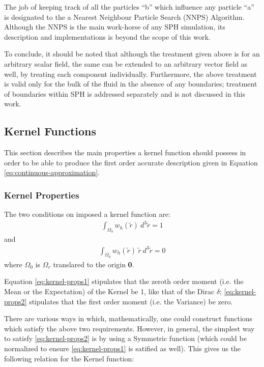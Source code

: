 The job of keeping track of all the particles ``b'' which influence any particle ``a'' is designated to the a Nearest Neighbour Particle Search (NNPS) Algorithm. Although the NNPS is the main work-horse of any SPH simulation, its description and implementations is beyond the scope of this work. 

To conclude, it should be noted that although the treatment given above is for an arbitrary scalar field, the same can be extended to an arbitrary vector field as well, by treating each component individually. Furthermore, the above treatment is valid only for the bulk of the fluid in the absence of any boundaries; treatment of boundaries within SPH is addressed separately and is not discussed in this work.

\subsection{Kernel Functions} \label{ssec:kernels}

This section describes the main properties a kernel function should possess in order to be able to produce the first order accurate description given in Equation \eqref{eq:continuous-approximation}.

\subsubsection{Kernel Properties}
 The two conditions on imposed a kernel function are:
 \begin{eqnarray} \label{eq:kernel-props1} 
  \int_{\varOmega_0} \textit{w$_h(\widetilde{r}) ~d^{3}\widetilde{r}$} = 1
 \end{eqnarray}
 and
 \begin{eqnarray}\label{eq:kernel-props2}
  \int_{\varOmega_0} \textit{w$_h(\widetilde{r})~ \widetilde{r}~ d^{3}\widetilde{r}$} = 0 
 \end{eqnarray} 
 where ${\varOmega_0}$ is ${\varOmega_r}$ translared to the origin \textbf{0}.
 

 Equation \eqref{eq:kernel-props1} stipulates that the zeroth order moment (i.e. the Mean or the Expectation) of the Kernel be 1, like that of the Dirac $\delta$; \eqref{eq:kernel-props2} stipulates that the first order moment (i.e. the Variance) be zero. 
 
 There are various ways in which, mathematically, one could construct functions which satisfy the above two requirements. However, in general, the simplest way to satisfy \eqref{eq:kernel-props2} is by using a Symmetric function (which could be normalized to ensure \eqref{eq:kernel-props1} is satified as well). \newpage This gives us the following relation for the Kernel function:
 
